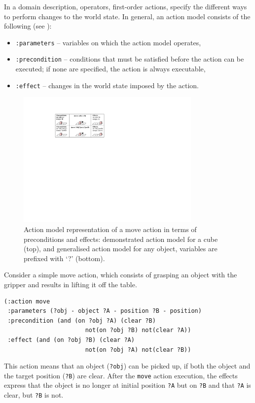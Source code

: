 In a domain description, operators, \ie first-order actions, specify the different ways to perform changes to the world state. 
In general, an action model consists of the following (see ):
\begin{itemize}
	\item \texttt{:parameters} -- variables on which the action model operates,
	\item \texttt{:precondition} -- conditions that must be satisfied before the action can be executed; if none are specified, the action is always executable,
	\item \texttt{:effect} -- changes in the world state imposed by the action.
\end{itemize}

\begin{figure}[h]
	\centering
	\includegraphics[width=0.8\textwidth]{figures/schema-logic}
	\caption{Action model representation of a move action in terms of preconditions and effects: demonstrated action model for a cube (top), and generalised action model for any object, variables are prefixed with `?' (bottom).}
	\label{fig:action model}
\end{figure}

Consider a simple move action, which consists of grasping an object with the gripper and results in lifting it off the table.
\begin{verbatim}
(:action move
 :parameters (?obj - object ?A - position ?B - position)
 :precondition (and (on ?obj ?A) (clear ?B)
                       not(on ?obj ?B) not(clear ?A))
 :effect (and (on ?obj ?B) (clear ?A)
                       not(on ?obj ?A) not(clear ?B))
\end{verbatim}

This action means that an object (\texttt{?obj}) can be picked up, if both the object and the target position (\texttt{?B}) are clear.
After the \texttt{move} action execution, the effects express that the object is no longer at initial position \texttt{?A} but on \texttt{?B} and that \texttt{?A} is clear, but \texttt{?B} is not.


